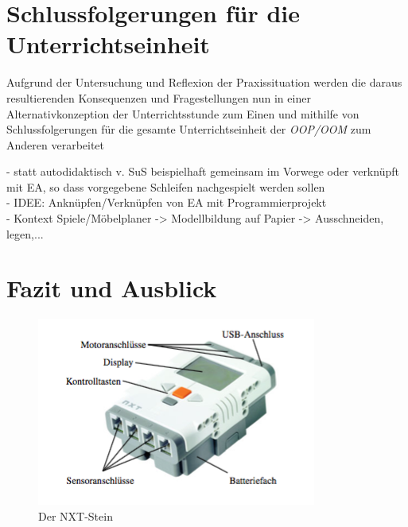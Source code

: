 \documentclass[paper=a4, DIV=13, BCOR=12mm, twoside=on, onecolumn=on, open = any, titlepage =on, parskip =half-, headsepline = on, footsepline = on, chapterprefix = on, sectionprefix = on, appendixprefix = off, fontsize = 11pt, numbers = noenddot, abstract = off]{scrreprt}
\begin{document}
\par \singlespacing
\chapter{Schlussfolgerungen für die Unterrichtseinheit}
\label{schlussfolgerungen}
\onehalfspacing

Aufgrund der Untersuchung und Reflexion der Praxissituation werden die daraus resultierenden Konsequenzen und Fragestellungen nun in einer Alternativkonzeption der Unterrichtsstunde zum Einen und mithilfe von Schlussfolgerungen für die gesamte Unterrichtseinheit der \emph{OOP/OOM} zum Anderen verarbeitet 

- statt autodidaktisch v. SuS beispielhaft gemeinsam im Vorwege oder verknüpft mit EA, so dass vorgegebene Schleifen nachgespielt werden sollen\\
- IDEE: Anknüpfen/Verknüpfen von EA mit Programmierprojekt\\
- Kontext Spiele/Möbelplaner -> Modellbildung auf Papier -> Ausschneiden, legen,...


\newpage
\chapter{Fazit und Ausblick}
\onehalfspacing

\begin{figure}[htb]
\centering
\includegraphics[scale=0.7]{images/NXT-Stein.png} 
\caption[Der NXT-Stein]{Der NXT-Stein \cite[S. 42]{berns:10}}
\label{fig:NXT Stein}
\end{figure}
\end{document}
